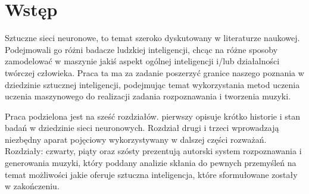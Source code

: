 \section*{Wstęp}

\noindent Sztuczne sieci neuronowe, to temat szeroko dyskutowany w literaturze naukowej. Podejmowali go różni badacze ludzkiej inteligencji, chcąc na różne sposoby zamodelować w maszynie jakiś aspekt ogólnej inteligencji i/lub działalności twórczej człowieka. Praca ta ma za zadanie poszerzyć granice naszego poznania w dziedzinie sztucznej inteligencji, podejmując temat wykorzystania metod uczenia uczenia maszynowego do realizacji zadania rozpoznawania i tworzenia muzyki.

Praca podzielona jest na sześć rozdziałów. pierwszy opisuje krótko historie i stan badań w dziedzinie sieci neuronowych. Rozdział drugi i trzeci wprowadzają niezbędny aparat pojęciowy wykorzystywany w dalszej części rozważań. Rozdziały: czwarty, piąty oraz szósty prezentują autorski system rozpoznawania i generowania muzyki, który poddany analizie skłania do pewnych przemyśleń na temat możliwości jakie oferuje sztuczna inteligencja, które sformułowane zostały w zakończeniu.



